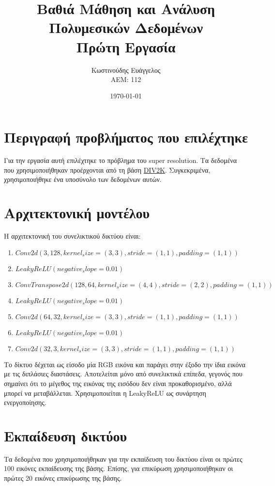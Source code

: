 \documentclass[a4paper]{article}
\title{Βαθιά Μάθηση και Ανάλυση Πολυμεσικών Δεδομένων \\ Πρώτη Εργασία}
\author{Κωστινούδης Ευάγγελος \\ΑΕΜ: 112}
\date{\today}
\begin{document}
\maketitle
{}
\newpage
{}

\section{Περιγραφή προβλήματος που επιλέχτηκε}

Για την εργασία αυτή επιλέχτηκε το πρόβλημα του super resolution. Τα δεδομένα
που χρησιμοποιήθηκαν προέρχονται από τη βάση
\href{https://data.vision.ee.ethz.ch/cvl/DIV2K/}{DIV2K}. Συγκεκριμένα,
χρησιμοποιήθηκε ένα υποσύνολο των δεδομένων αυτών.


\section{Αρχιτεκτονική μοντέλου}

Η αρχιτεκτονική του συνελικτικού δικτύου είναι:

\begin{enumerate}
\item $Conv2d(3, 128, kernel_size=(3, 3), stride=(1, 1), padding=(1, 1))$
\item $LeakyReLU(negative_slope=0.01)$
\item $ConvTranspose2d(128, 64, kernel_size=(4, 4), stride=(2, 2), padding=(1,
    1))$
\item $LeakyReLU(negative_slope=0.01)$
\item $Conv2d(64, 32, kernel_size=(3, 3), stride=(1, 1), padding=(1, 1))$
\item $LeakyReLU(negative_slope=0.01)$
\item $Conv2d(32, 3, kernel_size=(3, 3), stride=(1, 1), padding=(1, 1))$
\end{enumerate}

Το δίκτυο δέχεται ως είσοδο μία RGB εικόνα και παράγει στην έξοδο την ίδια
εικόνα με τις διπλάσιες διαστάσεις. Αποτελείται μόνο από συνελικτικά επίπεδα,
γεγονός που σημαίνει ότι το μέγεθος της εικόνας της εισόδου δεν είναι
προκαθορισμένο, αλλά μπορεί να μεταβάλλεται. Χρησιμοποιείται η LeakyReLU ως
συνάρτηση ενεργοποίησης.

\section{Εκπαίδευση δικτύου}

Τα δεδομένα που χρησιμοποιήθηκαν για την εκπαίδευση του δικτύου είναι οι πρώτες
100 εικόνες εκπαίδευσης της βάσης. Επίσης, για επικύρωση χρησιμοποιήθηκαν οι
πρώτες 20 εικόνες επικύρωσης της βάσης.
\end{document}
